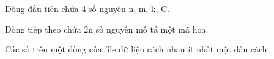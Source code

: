 Dòng đầu tiên chứa 4 số nguyên n, m, k, C.

Dòng tiếp theo chứa 2n số nguyên mô tả một mã hoa.

Các số trên một dòng của file dữ liệu cách nhau ít nhất một dấu cách.

\